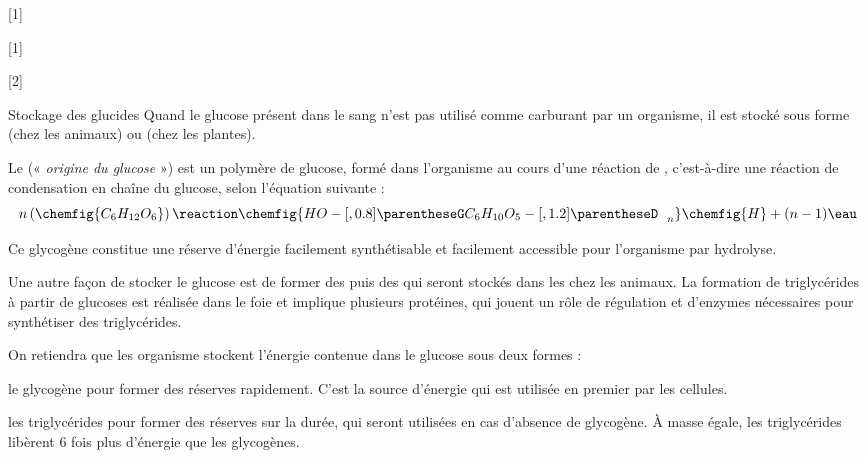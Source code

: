 [1]

[1]

[2]

\begin{doc}{Stockage des glucides}
  Quand le glucose présent dans le sang n'est pas utilisé comme carburant par un organisme, il est stocké sous forme  (chez les animaux) ou  (chez les plantes).

  Le  (« \textit{origine du glucose} ») est un polymère de glucose, formé dans l'organisme au cours d'une réaction de , c'est-à-dire une réaction de condensation en chaîne du glucose, selon l'équation suivante :
  \begin{equation*}
    n \left(\chemfig{C_6 H_{12} O_6}\right) \reaction
    \chemfig{HO-[,0.8] \parentheseG C_6 H_{10} O_5 -[,1.2]\parentheseD_{\phantom{B} n}}\chemfig{H}
    + (n-1)\eau
  \end{equation*}

  Ce glycogène constitue une réserve d'énergie facilement synthétisable et facilement accessible pour l'organisme par hydrolyse.

  Une autre façon de stocker le glucose est de former des  puis des  qui seront stockés dans les  chez les animaux.
  La formation de triglycérides à partir de glucoses est réalisée dans le foie et implique plusieurs protéines, qui jouent un rôle de régulation et d'enzymes nécessaires pour synthétiser des triglycérides.

  On retiendra que les organisme stockent l'énergie contenue dans le glucose sous deux formes :
  \begin{listePoints}
    \item le glycogène pour former des réserves rapidement. C'est la source d'énergie qui est utilisée en premier par les cellules.
    \item les triglycérides pour former des réserves sur la durée, qui seront utilisées en cas d'absence de glycogène. À masse égale, les triglycérides libèrent 6 fois plus d'énergie que les glycogènes.
  \end{listePoints}
\end{doc}